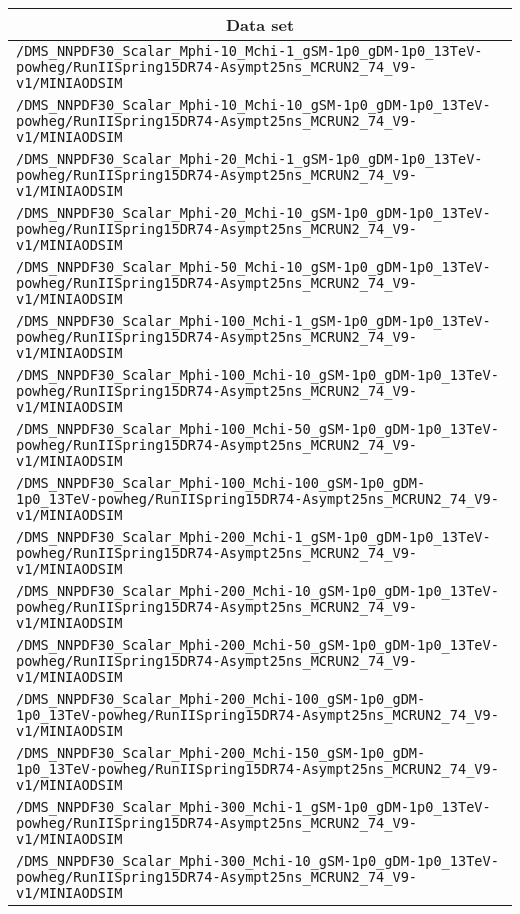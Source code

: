 \begin{center}
\begin{tabular}{l}
\hline\hline
\multicolumn{1}{c}{Data set}\tabularnewline
\hline
\verb!/DMS_NNPDF30_Scalar_Mphi-10_Mchi-1_gSM-1p0_gDM-1p0_13TeV-powheg/RunIISpring15DR74-Asympt25ns_MCRUN2_74_V9-v1/MINIAODSIM! \tabularnewline
\verb!/DMS_NNPDF30_Scalar_Mphi-10_Mchi-10_gSM-1p0_gDM-1p0_13TeV-powheg/RunIISpring15DR74-Asympt25ns_MCRUN2_74_V9-v1/MINIAODSIM! \tabularnewline
\verb!/DMS_NNPDF30_Scalar_Mphi-20_Mchi-1_gSM-1p0_gDM-1p0_13TeV-powheg/RunIISpring15DR74-Asympt25ns_MCRUN2_74_V9-v1/MINIAODSIM! \tabularnewline
\verb!/DMS_NNPDF30_Scalar_Mphi-20_Mchi-10_gSM-1p0_gDM-1p0_13TeV-powheg/RunIISpring15DR74-Asympt25ns_MCRUN2_74_V9-v1/MINIAODSIM! \tabularnewline
\verb!/DMS_NNPDF30_Scalar_Mphi-50_Mchi-10_gSM-1p0_gDM-1p0_13TeV-powheg/RunIISpring15DR74-Asympt25ns_MCRUN2_74_V9-v1/MINIAODSIM! \tabularnewline
\verb!/DMS_NNPDF30_Scalar_Mphi-100_Mchi-1_gSM-1p0_gDM-1p0_13TeV-powheg/RunIISpring15DR74-Asympt25ns_MCRUN2_74_V9-v1/MINIAODSIM! \tabularnewline
\verb!/DMS_NNPDF30_Scalar_Mphi-100_Mchi-10_gSM-1p0_gDM-1p0_13TeV-powheg/RunIISpring15DR74-Asympt25ns_MCRUN2_74_V9-v1/MINIAODSIM! \tabularnewline
\verb!/DMS_NNPDF30_Scalar_Mphi-100_Mchi-50_gSM-1p0_gDM-1p0_13TeV-powheg/RunIISpring15DR74-Asympt25ns_MCRUN2_74_V9-v1/MINIAODSIM! \tabularnewline
\verb!/DMS_NNPDF30_Scalar_Mphi-100_Mchi-100_gSM-1p0_gDM-1p0_13TeV-powheg/RunIISpring15DR74-Asympt25ns_MCRUN2_74_V9-v1/MINIAODSIM! \tabularnewline
\verb!/DMS_NNPDF30_Scalar_Mphi-200_Mchi-1_gSM-1p0_gDM-1p0_13TeV-powheg/RunIISpring15DR74-Asympt25ns_MCRUN2_74_V9-v1/MINIAODSIM! \tabularnewline
\verb!/DMS_NNPDF30_Scalar_Mphi-200_Mchi-10_gSM-1p0_gDM-1p0_13TeV-powheg/RunIISpring15DR74-Asympt25ns_MCRUN2_74_V9-v1/MINIAODSIM! \tabularnewline
\verb!/DMS_NNPDF30_Scalar_Mphi-200_Mchi-50_gSM-1p0_gDM-1p0_13TeV-powheg/RunIISpring15DR74-Asympt25ns_MCRUN2_74_V9-v1/MINIAODSIM! \tabularnewline
\verb!/DMS_NNPDF30_Scalar_Mphi-200_Mchi-100_gSM-1p0_gDM-1p0_13TeV-powheg/RunIISpring15DR74-Asympt25ns_MCRUN2_74_V9-v1/MINIAODSIM! \tabularnewline
\verb!/DMS_NNPDF30_Scalar_Mphi-200_Mchi-150_gSM-1p0_gDM-1p0_13TeV-powheg/RunIISpring15DR74-Asympt25ns_MCRUN2_74_V9-v1/MINIAODSIM! \tabularnewline
\verb!/DMS_NNPDF30_Scalar_Mphi-300_Mchi-1_gSM-1p0_gDM-1p0_13TeV-powheg/RunIISpring15DR74-Asympt25ns_MCRUN2_74_V9-v1/MINIAODSIM! \tabularnewline
\verb!/DMS_NNPDF30_Scalar_Mphi-300_Mchi-10_gSM-1p0_gDM-1p0_13TeV-powheg/RunIISpring15DR74-Asympt25ns_MCRUN2_74_V9-v1/MINIAODSIM! \tabularnewline

\end{tabular}
\end{center}
